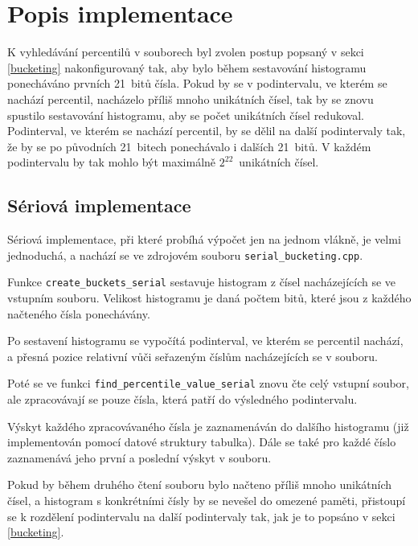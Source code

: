 \documentclass[12pt, a4paper]{article}
\newcommand{\bucketingparamone}{21}
\newcommand{\bucketingparamtwo}{21}
\newcommand{\bucketingparamthree}{22}
\let\oldsection\section
\renewcommand\section{\clearpage\oldsection}
\begin{document}
\section{Popis implementace}

K vyhledávání percentilů v souborech byl zvolen postup popsaný v sekci \ref{bucketing} nakonfigurovaný tak, aby bylo během sestavování histogramu ponecháváno prvních \bucketingparamone~bitů čísla.
Pokud by se v podintervalu, ve kterém se nachází percentil, nacházelo příliš mnoho unikátních čísel, tak by se znovu spustilo sestavování histogramu, aby se počet unikátních čísel redukoval. 
Podinterval, ve kterém se nachází percentil, by se dělil na další podintervaly tak, že by se po původních \bucketingparamone~bitech ponechávalo i dalších \bucketingparamtwo~bitů. 
V každém podintervalu by tak mohlo být maximálně $2^{\bucketingparamthree}$~unikátních čísel.

\subsection{Sériová implementace}
Sériová implementace, při které probíhá výpočet jen na jednom vlákně, je velmi jednoduchá, a nachází se ve zdrojovém souboru \texttt{serial\_bucketing.cpp}.


Funkce \texttt{create\_buckets\_serial} sestavuje histogram z čísel nacházejících se ve vstupním souboru.
Velikost histogramu je daná počtem bitů, které jsou z každého načteného čísla ponechávány.

Po sestavení histogramu se vypočítá podinterval, ve kterém se percentil nachází, a přesná pozice relativní vůči seřazeným číslům nacházejících se v souboru. 

Poté se ve funkci \texttt{find\_percentile\_value\_serial} znovu čte celý vstupní soubor, ale zpracovávají se pouze čísla, která patří do výsledného podintervalu.

Výskyt každého zpracovávaného čísla je zaznamenáván do dalšího histogramu (již implementován pomocí datové struktury tabulka). 
Dále se také pro každé číslo zaznamenává jeho první a poslední výskyt v souboru.

Pokud by během druhého čtení souboru bylo načteno příliš mnoho unikátních čísel, a histogram s konkrétními čísly by se nevešel do omezené paměti, přistoupí se k rozdělení podintervalu na další podintervaly tak, jak je to popsáno v sekci \ref{bucketing}.
\end{document}
